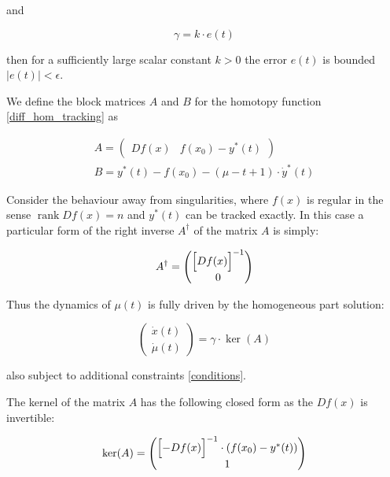 \documentclass[11pt,american]{article}
\DeclareMathOperator{\rank}{\operatorname{rank}}
\theoremstyle{definition}
\theoremstyle{plain}
\theoremstyle{remark}
\begin{document}
and

\begin{equation}
\gamma = k \cdot e(t)
\end{equation}

then for a sufficiently large scalar constant $k > 0$ the error $e(t)$ is bounded $|e(t)| < \epsilon$.

We define the block matrices $A$ and $B$ for the homotopy function \eqref{diff_hom_tracking} as

\begin{equation}\label{AB_blocks}
\begin{gathered}
A = \begin{pmatrix}
D f(x) & f(x_0) - y^*(t)
\end{pmatrix} \\
B = y^*(t) - f(x_0) - (\mu - t + 1) \cdot \dot y^*(t)
\end{gathered}
\end{equation}

Consider the behaviour away from singularities, where $f(x)$ is regular in the sense $\rank D f(x)=n$ and $y^*(t)$ can be tracked exactly.
In this case a particular form of the right inverse $A^\dagger$ of the matrix $A$ is simply:

\begin{equation}
A^\dagger = \begin{pmatrix}
\Bigl[ D f(x) \Bigr]^{-1} \\ 0
\end{pmatrix}
\end{equation}

Thus the dynamics of $\mu(t)$ is fully driven by the homogeneous part solution:

\begin{equation}
\begin{pmatrix} \dot{x}(t) \\ \dot{\mu}(t) \end{pmatrix} = \gamma \cdot \ker(A)
\end{equation}

also subject to additional constraints \eqref{conditions}.

The kernel of the matrix $A$ has the following closed form as the $D f(x)$ is invertible:

\begin{equation}
\ker(A) = \begin{pmatrix}
\Bigl[ - D f(x) \Bigr]^{-1} \cdot (f(x_0) - y^*(t)) \\ 1
\end{pmatrix}
\end{equation}
\end{document}
